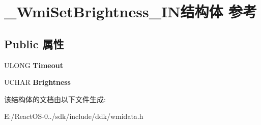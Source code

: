 \hypertarget{struct___wmi_set_brightness___i_n}{}\section{\+\_\+\+Wmi\+Set\+Brightness\+\_\+\+I\+N结构体 参考}
\label{struct___wmi_set_brightness___i_n}
\subsection*{Public 属性}
\begin{DoxyCompactItemize}
\item 
\mbox{\label{struct___wmi_set_brightness___i_n_a4033764615afb9bdc55dbae2a5e62bc7}} 
U\+L\+O\+NG {\bfseries Timeout}
\item 
\mbox{\label{struct___wmi_set_brightness___i_n_a5028b68f539add19a55f160543066e23}} 
U\+C\+H\+AR {\bfseries Brightness}
\end{DoxyCompactItemize}


该结构体的文档由以下文件生成\+:\begin{DoxyCompactItemize}
\item 
E\+:/\+React\+O\+S-\/0../sdk/include/ddk/wmidata.\+h\end{DoxyCompactItemize}
